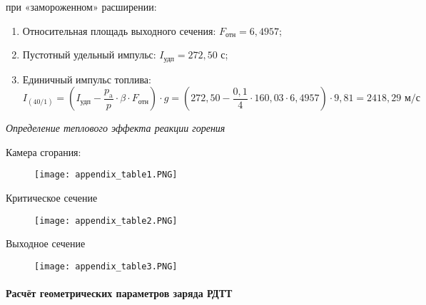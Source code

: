 при «замороженном» расширении:
\begin{enumerate}[1.]
	\item Относительная площадь выходного сечения:	$F_\text{отн} = 6,4957$;
	\item Пустотный удельный импульс:				$I_\text{удп} = 272,50$ с;
	\item Единичный импульс топлива:	
$$I_(40/1)=(I_\text{удп}-\frac{p_\text{a}}{p} \cdot \beta \cdot F_\text{отн} ) \cdot g=(272,50-\frac{0,1}{4} \cdot 160,03 \cdot 6,4957) \cdot 9,81=2418,29 \text{ м/с}$$
\end{enumerate}

\emph{Определение теплового эффекта реакции горения}

Камера сгорания:

\begin{figure}[!h]
\begin{center}
    \texttt{[image: appendix\_table1.PNG]}
    \label{fig:appendix_table1}
\end{center}
\end{figure}

\clearpage
Критическое сечение
\begin{figure}[!h]
\begin{center}
    \texttt{[image: appendix\_table2.PNG]}
    \label{fig:appendix_table2}
\end{center}
\end{figure}

Выходное сечение
\begin{figure}[!h]
\begin{center}
    \texttt{[image: appendix\_table3.PNG]}
    \label{fig:appendix_table3}
\end{center}
\end{figure}

\paragraph{Расчёт геометрических параметров заряда РДТТ}


